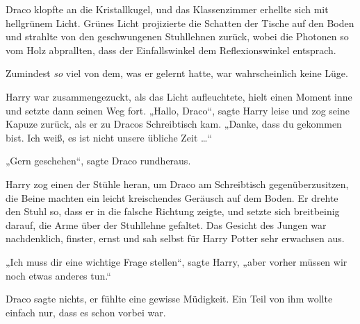 Draco klopfte an die Kristallkugel, und das Klassenzimmer erhellte sich mit hellgrünem Licht. Grünes Licht projizierte die Schatten der Tische auf den Boden und strahlte von den geschwungenen Stuhllehnen zurück, wobei die Photonen so vom Holz abprallten, dass der Einfallswinkel dem Reflexionswinkel entsprach.

Zumindest \emph{so} viel von dem, was er gelernt hatte, war wahrscheinlich keine Lüge.

Harry war zusammengezuckt, als das Licht aufleuchtete, hielt einen Moment inne und setzte dann seinen Weg fort.
„Hallo, Draco“, sagte Harry leise und zog seine Kapuze zurück, als er zu Dracos Schreibtisch kam.
„Danke, dass du gekommen bist. Ich weiß, es ist nicht unsere übliche Zeit …“

„Gern geschehen“, sagte Draco rundheraus.

Harry zog einen der Stühle heran, um Draco am Schreibtisch gegenüberzusitzen, die Beine machten ein leicht kreischendes Geräusch auf dem Boden. Er drehte den Stuhl so, dass er in die falsche Richtung zeigte, und setzte sich breitbeinig darauf, die Arme über der Stuhllehne gefaltet. Das Gesicht des Jungen war nachdenklich, finster, ernst und sah selbst für Harry Potter sehr erwachsen aus.

„Ich muss dir eine wichtige Frage stellen“, sagte Harry, „aber vorher müssen wir noch etwas anderes tun.“

Draco sagte nichts, er fühlte eine gewisse Müdigkeit. Ein Teil von ihm wollte einfach nur, dass es schon vorbei war.

